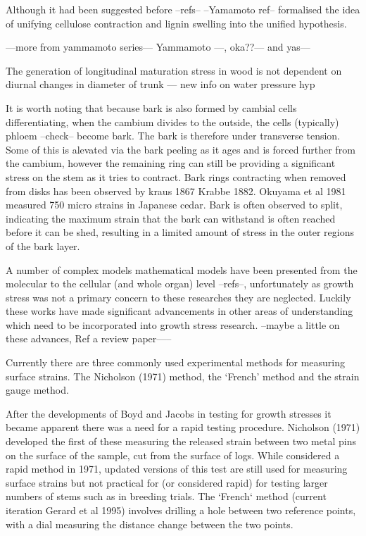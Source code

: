 \documentclass{article}
\begin{document}
Although it had been suggested before --refs-- --Yamamoto ref-- formalised the
idea of unifying cellulose contraction and lignin swelling into the unified
hypothesis.

 ---more from yammamoto series--- Yammamoto ---, oka??--- and yas---

The generation of longitudinal maturation stress in wood is not dependent on
diurnal changes in diameter of trunk --- new info on water pressure hyp

It is worth noting that because bark is also formed by cambial cells
differentiating, when the cambium divides to the outside, the cells (typically)
phloem --check-- become bark. The bark is therefore under transverse tension.
Some of this is alevated via the bark peeling as it ages and is forced further
from the cambium, however the remaining ring can still be providing a
significant stress on the stem as it tries to contract. Bark rings contracting
when removed from disks has been observed by kraus 1867 Krabbe 1882. Okuyama et
al 1981 measured 750 micro strains in Japanese cedar. Bark is often observed to
split, indicating the maximum strain that the bark can withstand is often
reached before it can be shed, resulting in a limited amount of stress in the
outer regions of the bark layer.

A number of complex models mathematical models have been presented from the
molecular to the cellular (and whole organ) level --refs--, unfortunately as
growth stress was not a primary concern to these researches they are neglected.
Luckily these works have made significant advancements in other areas of
understanding which need to be incorporated into growth stress research. --maybe
a little on these advances, Ref a review paper-----

Currently there are three commonly used experimental methods for measuring
surface strains. The Nicholson (1971) method, the `French' method and the strain
gauge method.

After the developments of Boyd and Jacobs in testing for growth stresses it
became apparent there was a need for a rapid testing procedure. Nicholson (1971)
developed the first of these measuring the released strain between two metal pins
on the surface of the sample, cut from the surface of logs. While considered a
rapid method in 1971, updated versions of this test are still used for measuring
surface strains but not practical for (or considered rapid) for testing larger
numbers of stems such as in breeding trials. The `French` method (current
iteration Gerard et al 1995) involves drilling a hole between two reference
points, with a dial measuring the distance change between the two points.
\end{document}
